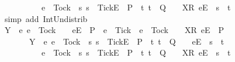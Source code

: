 \begin{isabellebody}
\ \ \ \ \ \ \ \ \ \ e\ {\isacharequal}\ Tock\ {\isasymand}\ {\isacharparenleft}{\isasymexists}s{\isachardot}\ s\ {\isacharat}\ {\isacharbrackleft}{\isacharbrackleft}Tick{\isacharbrackright}\isactrlsub E{\isacharbrackright}\ {\isasymin}\ P\ {\isasymand}\ {\isacharparenleft}{\isasymexists}t{\isachardot}\ t\ {\isasymin}\ Q\ {\isasymand}\ {\isasymrho}\ {\isacharat}\ {\isacharbrackleft}{\isacharbrackleft}X{\isacharbrackright}\isactrlsub R{\isacharcomma}\ {\isacharbrackleft}e{\isacharbrackright}\isactrlsub E{\isacharbrackright}\ {\isacharequal}\ s\ {\isacharat}\ t{\isacharparenright}{\isacharparenright}{\isacharbraceright}{\isacharparenright}\ {\isacharequal}\ {\isacharbraceleft}{\isacharbraceright}{\isachardoublequoteclose}\isanewline
\ \ \ \ \ \ \isamarkupfalse%
\ {\isacharparenleft}simp\ add{\isacharcolon}\ Int{\isacharunderscore}Un{\isacharunderscore}distrib{\isacharparenright}\ \ \isanewline
\ \ \ \ \isamarkupfalse%
\ \isamarkupfalse%
\ {\isachardoublequoteopen}Y\ {\isasyminter}\ {\isacharbraceleft}e{\isachardot}\ e\ {\isasymnoteq}\ Tock\ {\isasymand}\ {\isasymrho}\ {\isacharat}\ {\isacharbrackleft}{\isacharbrackleft}e{\isacharbrackright}\isactrlsub E{\isacharbrackright}\ {\isasymin}\ P\ {\isasymand}\ e\ {\isasymnoteq}\ Tick\ {\isasymor}\ e\ {\isacharequal}\ Tock\ {\isasymand}\ {\isasymrho}\ {\isacharat}\ {\isacharbrackleft}{\isacharbrackleft}X{\isacharbrackright}\isactrlsub R{\isacharcomma}\ {\isacharbrackleft}e{\isacharbrackright}\isactrlsub E{\isacharbrackright}\ {\isasymin}\ P{\isacharbraceright}\ {\isacharequal}\ {\isacharbraceleft}{\isacharbraceright}\isanewline
\ \ \ \ \ \ {\isasymand}\ Y\ {\isasyminter}\ {\isacharbraceleft}e{\isachardot}\ e\ {\isasymnoteq}\ Tock\ {\isasymand}\ {\isacharparenleft}{\isasymexists}s{\isachardot}\ s\ {\isacharat}\ {\isacharbrackleft}{\isacharbrackleft}Tick{\isacharbrackright}\isactrlsub E{\isacharbrackright}\ {\isasymin}\ P\ {\isasymand}\ {\isacharparenleft}{\isasymexists}t{\isachardot}\ t\ {\isasymin}\ Q\ {\isasymand}\ {\isasymrho}\ {\isacharat}\ {\isacharbrackleft}{\isacharbrackleft}e{\isacharbrackright}\isactrlsub E{\isacharbrackright}\ {\isacharequal}\ s\ {\isacharat}\ t{\isacharparenright}{\isacharparenright}\ {\isasymor}\isanewline
\ \ \ \ \ \ \ \ \ \ e\ {\isacharequal}\ Tock\ {\isasymand}\ {\isacharparenleft}{\isasymexists}s{\isachardot}\ s\ {\isacharat}\ {\isacharbrackleft}{\isacharbrackleft}Tick{\isacharbrackright}\isactrlsub E{\isacharbrackright}\ {\isasymin}\ P\ {\isasymand}\ {\isacharparenleft}{\isasymexists}t{\isachardot}\ t\ {\isasymin}\ Q\ {\isasymand}\ {\isasymrho}\ {\isacharat}\ {\isacharbrackleft}{\isacharbrackleft}X{\isacharbrackright}\isactrlsub R{\isacharcomma}\ {\isacharbrackleft}e{\isacharbrackright}\isactrlsub E{\isacharbrackright}\ {\isacharequal}\ s\ {\isacharat}\ t{\isacharparenright}{\isacharparenright}{\isacharbraceright}\ {\isacharequal}\ {\isacharbraceleft}{\isacharbraceright}{\isachardoublequoteclose}\isanewline

\end{isabellebody}
